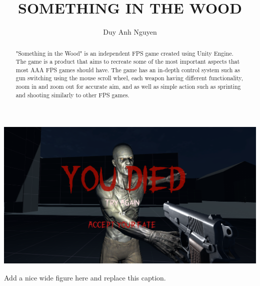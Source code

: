 \documentclass[sigconf]{acmart}
\begin{document}
\title{SOMETHING IN THE WOOD}

\author{Duy Anh Nguyen}


\renewcommand{\shortauthors}{}

\begin{abstract}
  "Something in the Wood" is an independent FPS game created using Unity Engine. The game is a product that aims to recreate some of the most important aspects that most AAA FPS games should have. The game has an in-depth control system such as gun switching using the mouse scroll wheel, each weapon having different functionality, zoom in and zoom out for accurate aim, and as well as simple action such as sprinting and shooting similarly to other FPS games. 
\end{abstract}


\begin{teaserfigure}
  \includegraphics[width=\textwidth]{gfx/wood.png}
  \caption{Add a nice wide figure here and replace this caption.}
  \label{fig:teaser}
\end{teaserfigure}
\end{document}
